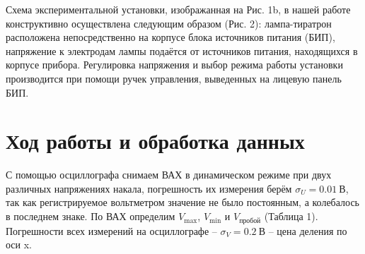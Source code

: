 \documentclass[a4paper,12pt]{article}
\begin{document}
Схема экспериментальной установки, изображанная на Рис. 1b, в нашей работе конструктивно осуществлена следующим образом (Рис. 2): лампа-тиратрон расположена непосредственно на корпусе блока источников питания (БИП), напряжение к электродам лампы подаётся от источников питания, находящихся в корпусе прибора. Регулировка напряжения и выбор режима работы установки производится при помощи ручек управления, выведенных на лицевую панель БИП.
\section*{Ход работы и обработка данных}
С помощью осциллографа снимаем ВАХ в динамическом режиме при двух различных напряжениях накала, погрешность их измерения берём $\sigma_U = 0.01~\text{В}$, так как регистрируемое вольтметром значение не было постоянным, а колебалось в последнем знаке. По ВАХ определим $V_{\text{max}}$, $V_{\text{min}}$ и $V_{\text{пробой}}$ (Таблица 1). Погрешности всех измерений на осциллографе -- $\sigma_V = 0.2~\text{В}$ -- цена деления по оси x.
\end{document}
